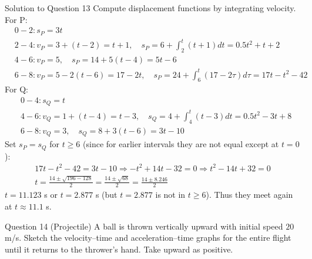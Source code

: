 \documentclass{beamer}
\begin{document}
\begin{frame}[shrink=15]{Solution to Question 13}
Compute displacement functions by integrating velocity.
For P:
\begin{align*}
    &0-2: s_P = 3t \\
    &2-4: v_P = 3 + (t-2) = t+1, \quad s_P = 6 + \int_2^t (t+1) dt = 0.5t^2 + t + 2 \\
    &4-6: v_P = 5, \quad s_P = 14 + 5(t-4) = 5t -6 \\
    &6-8: v_P = 5 -2(t-6) = 17 -2t, \quad s_P = 24 + \int_6^t (17-2\tau) d\tau = 17t - t^2 -42
\end{align*}
For Q:
\begin{align*}
    &0-4: s_Q = t \\
    &4-6: v_Q = 1 + (t-4) = t-3, \quad s_Q = 4 + \int_4^t (t-3) dt = 0.5t^2 -3t + 8 \\
    &6-8: v_Q = 3, \quad s_Q = 8 + 3(t-6) = 3t -10
\end{align*}
Set $s_P = s_Q$ for $t \ge 6$ (since for earlier intervals they are not equal except at $t=0$):
\begin{align*}
    17t - t^2 -42 = 3t -10 \Rightarrow -t^2 + 14t -32 = 0 \Rightarrow t^2 -14t +32 = 0 \\
    t = \frac{14 \pm \sqrt{196 -128}}{2} = \frac{14 \pm \sqrt{68}}{2} = \frac{14 \pm 8.246}{2}
\end{align*}
$t = 11.123$ s or $t = 2.877$ s (but $t=2.877$ is not in $t \ge 6$). Thus they meet again at $t \approx 11.1$ s.
\end{frame}

\begin{frame}[shrink=15]{Question 14 (Projectile)}
A ball is thrown vertically upward with initial speed $20$ m/s. Sketch the velocity–time and acceleration–time graphs for the entire flight until it returns to the thrower's hand. Take upward as positive.
\end{frame}
\end{document}
